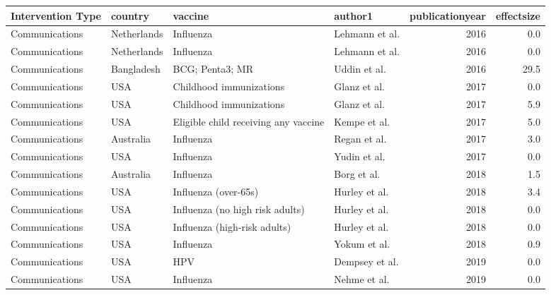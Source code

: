 
\begin{tabular}{llllrr}
\toprule
Intervention Type & country & vaccine & author1 & publicationyear & effectsize\\
\midrule
Communications & Netherlands & Influenza & Lehmann et al. & 2016 & 0.0\\
Communications & Netherlands & Influenza & Lehmann et al. & 2016 & 0.0\\
Communications & Bangladesh & BCG; Penta3; MR & Uddin et al. & 2016 & 29.5\\
Communications & USA & Childhood immunizations & Glanz et al. & 2017 & 0.0\\
Communications & USA & Childhood immunizations & Glanz et al. & 2017 & 5.9\\
\addlinespace
Communications & USA & Eligible child receiving any vaccine & Kempe et al. & 2017 & 5.0\\
Communications & Australia & Influenza & Regan et al. & 2017 & 3.0\\
Communications & USA & Influenza & Yudin et al. & 2017 & 0.0\\
Communications & Australia & Influenza & Borg et al. & 2018 & 1.5\\
Communications & USA & Influenza (over-65s) & Hurley et al. & 2018 & 3.4\\
\addlinespace
Communications & USA & Influenza (no high risk adults) & Hurley et al. & 2018 & 0.0\\
Communications & USA & Influenza (high-risk adults) & Hurley et al. & 2018 & 0.0\\
Communications & USA & Influenza & Yokum et al. & 2018 & 0.9\\
Communications & USA & HPV & Dempsey et al. & 2019 & 0.0\\
Communications & USA & Influenza & Nehme et al. & 2019 & 0.0\\
\bottomrule
\end{tabular}
